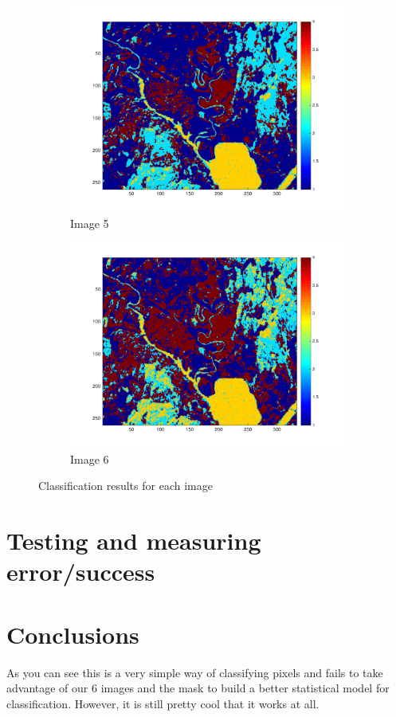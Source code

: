 \documentclass[12pt,a4paper]{report}
\begin{document}
\begin{figure}[!ht]
	\begin{subfigure}{0.5\textwidth}
	\centering
	\includegraphics[width=1.0\textwidth]{Feature5ClassificationResult}	
	\caption*{Image 5}
	\end{subfigure}
	\begin{subfigure}{0.5\textwidth}
	\centering
	\includegraphics[width=1.0\textwidth]{Feature6ClassificationResult}	
	\caption*{Image 6}
	\end{subfigure}
	\caption{Classification results for each image}
\end{figure}

\section*{Testing and measuring error/success }

\section*{Conclusions}
As you can see this is a very simple way of classifying pixels and fails to take advantage of our 6 images and the mask to build a better statistical model for classification. However, it is still pretty cool that it works at all.
\end{document}
